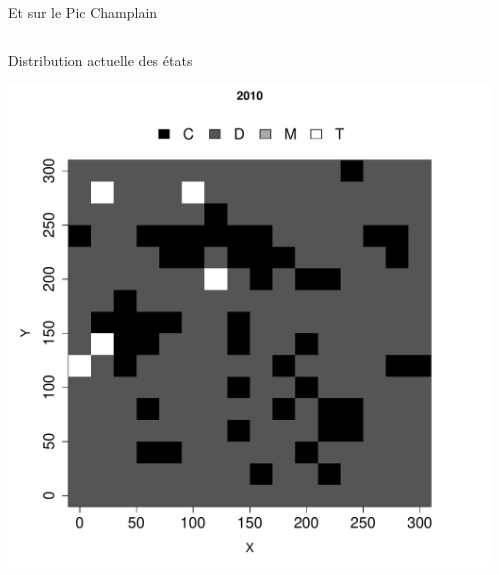 \documentclass{eecslides}
\begin{document}

	\begin{frame}{Et sur le Pic Champlain}
		\begin{columns}
			\begin{column}{0.5\textwidth}
				Distribution actuelle des états
				\begin{center}
					\includegraphics[height=0.5\textheight]{BIC2010}
				\end{center}
			\end{column}
			\begin{column}{0.5\textwidth}

				
			\end{column}
		\end{columns}	    	
	\end{frame}
\end{document}
